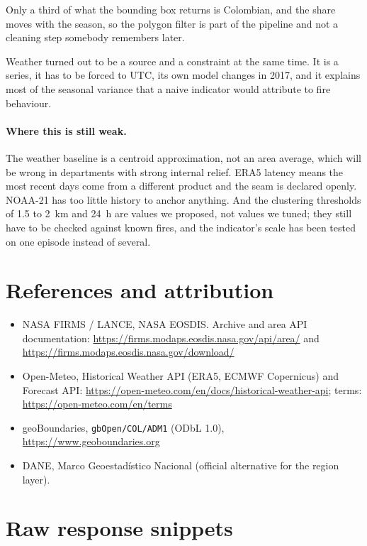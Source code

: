 \documentclass[11pt,a4paper]{article}
\newcommand{\code}[1]{\texttt{\small #1}}
\begin{document}
Only a third of what the bounding box returns is Colombian, and the share moves with the season, so
the polygon filter is part of the pipeline and not a cleaning step somebody remembers later.

Weather turned out to be a source and a constraint at the same time. It is a series, it has to be
forced to UTC, its own model changes in 2017, and it explains most of the seasonal variance that a
naive indicator would attribute to fire behaviour.

\paragraph{Where this is still weak.} The weather baseline is a centroid approximation, not an area
average, which will be wrong in departments with strong internal relief. ERA5 latency means the most
recent days come from a different product and the seam is declared openly. NOAA-21 has
too little history to anchor anything. And the clustering thresholds of 1.5 to 2~km and 24~h are
values we proposed, not values we tuned; they still have to be checked against known fires, and the
indicator's scale has been tested on one episode instead of several.

\section*{References and attribution}
\small
\begin{itemize}
  \item NASA FIRMS / LANCE, NASA EOSDIS. Archive and area API documentation:
        \url{https://firms.modaps.eosdis.nasa.gov/api/area/} and
        \url{https://firms.modaps.eosdis.nasa.gov/download/}
  \item Open-Meteo, Historical Weather API (ERA5, ECMWF Copernicus) and Forecast API:
        \url{https://open-meteo.com/en/docs/historical-weather-api}; terms:
        \url{https://open-meteo.com/en/terms}
  \item geoBoundaries, \code{gbOpen/COL/ADM1} (ODbL 1.0), \url{https://www.geoboundaries.org}
  \item DANE, Marco Geoestadístico Nacional (official alternative for the region layer).
\end{itemize}


\appendix
\section{Raw response snippets}\label{app:snippets}
\end{document}
